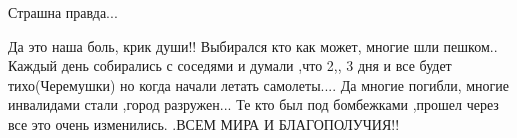  
 
 
 
 

\qqSecCmt


Страшна правда...


Да это наша боль, крик души!! Выбирался кто как может, многие шли пешком.. Каждый
день собирались с соседями и думали ,что 2,, 3 дня и все будет тихо(Черемушки)
но когда начали летать самолеты.... Да многие погибли, многие инвалидами стали
,город разружен... Те кто был под бомбежками ,прошел через все это очень
изменились. .ВСЕМ МИРА И БЛАГОПОЛУЧИЯ!!
